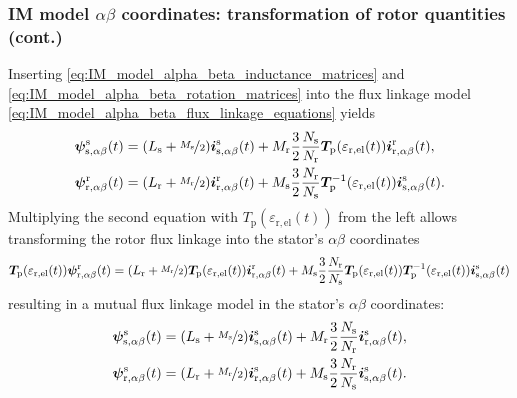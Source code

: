 \begin{frame}
	\frametitle{IM model $\alpha\beta$ coordinates: transformation of rotor quantities (cont.)}
    Inserting \eqref{eq:IM_model_alpha_beta_inductance_matrices} and \eqref{eq:IM_model_alpha_beta_rotation_matrices} into the flux linkage model \eqref{eq:IM_model_alpha_beta_flux_linkage_equations} yields
    \begin{equation}
        \begin{split}
            \bm{\psi}^\mathrm{s}_\mathrm{s,\alpha\beta}(t) & = (L_\mathrm{s} +\nicefrac{M_\mathrm{s}}{2}) \bm{i}^\mathrm{s}_{\mathrm{s},\alpha\beta}(t) +  M_{\mathrm{r}}\frac{3}{2}\frac{N_\mathrm{s}}{N_\mathrm{r}} \bm{T}_\mathrm{p}(\varepsilon_\mathrm{r,el}(t))\bm{i}^\mathrm{r}_{\mathrm{r},\alpha\beta}(t),\\
            \bm{\psi}^\mathrm{r}_\mathrm{r,\alpha\beta}(t) & = (L_\mathrm{r} +\nicefrac{M_\mathrm{r}}{2}) \bm{i}^\mathrm{r}_{\mathrm{r},\alpha\beta}(t) +  M_{\mathrm{s}}\frac{3}{2}\frac{N_\mathrm{r}}{N_\mathrm{s}} \bm{T}_\mathrm{p}^{-1}(\varepsilon_\mathrm{r,el}(t))\bm{i}^\mathrm{s}_{\mathrm{s},\alpha\beta}(t).
        \end{split}
    \end{equation}
    \pause
    Multiplying the second equation with $T_\mathrm{p}(\varepsilon_\mathrm{r,el}(t))$ from the left allows transforming the rotor flux linkage into the stator's $\alpha\beta$ coordinates
    \begin{equation*}
            \bm{T}_\mathrm{p}(\varepsilon_\mathrm{r,el}(t))\bm{\psi}^\mathrm{r}_\mathrm{r,\alpha\beta}(t)  = (L_\mathrm{r} +\nicefrac{M_\mathrm{r}}{2}) \bm{T}_\mathrm{p}(\varepsilon_\mathrm{r,el}(t))\bm{i}^\mathrm{r}_{\mathrm{r},\alpha\beta}(t) +  M_{\mathrm{s}}\frac{3}{2}\frac{N_\mathrm{r}}{N_\mathrm{s}} \bm{T}_\mathrm{p}(\varepsilon_\mathrm{r,el}(t))\bm{T}_\mathrm{p}^{-1}(\varepsilon_\mathrm{r,el}(t))\bm{i}^\mathrm{s}_{\mathrm{s},\alpha\beta}(t)
    \end{equation*}
    \pause
    resulting in a mutual flux linkage model in the stator's $\alpha\beta$ coordinates:
    \begin{equation}
        \begin{split}
            \bm{\psi}^\mathrm{s}_\mathrm{s,\alpha\beta}(t) & = (L_\mathrm{s} +\nicefrac{M_\mathrm{s}}{2}) \bm{i}^\mathrm{s}_{\mathrm{s},\alpha\beta}(t) +  M_{\mathrm{r}}\frac{3}{2}\frac{N_\mathrm{s}}{N_\mathrm{r}} \bm{i}^\mathrm{s}_{\mathrm{r},\alpha\beta}(t),\\
            \bm{\psi}^\mathrm{s}_\mathrm{r,\alpha\beta}(t) & = (L_\mathrm{r} +\nicefrac{M_\mathrm{r}}{2}) \bm{i}^\mathrm{s}_{\mathrm{r},\alpha\beta}(t) +  M_{\mathrm{s}}\frac{3}{2}\frac{N_\mathrm{r}}{N_\mathrm{s}} \bm{i}^\mathrm{s}_{\mathrm{s},\alpha\beta}(t).
        \end{split}
        \label{eq:IM_model_alpha_beta_flux_linkage_equations_stator_oriented}
    \end{equation}
\end{frame}

